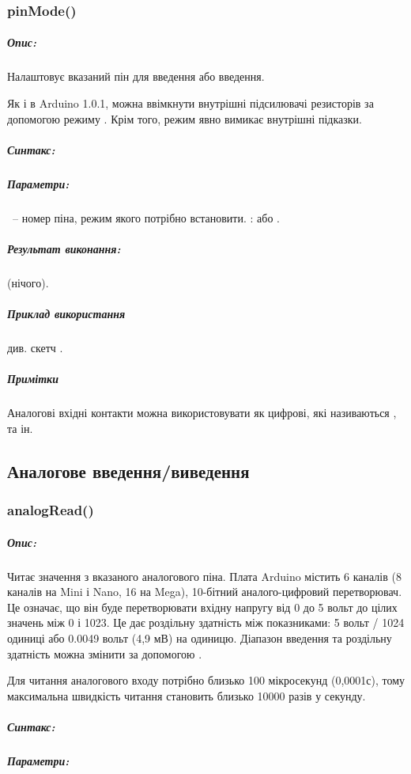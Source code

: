 \documentclass[12pt,a4paper]{report}  %
\begin{document}
\subsubsection{pinMode()}

\subparagraph{Опис:}

Налаштовує вказаний пін для введення або введення.

Як і в Arduino 1.0.1, можна ввімкнути внутрішні підсилювачі резисторів за допомогою режиму . Крім того, режим  явно вимикає внутрішні підказки.

\subparagraph{Синтакс:} 
\subparagraph{Параметри:}
~-- номер піна, режим якого потрібно встановити.
:  або .

\subparagraph{Результат виконання:}  (нічого).

\subparagraph{Приклад використання} див. скетч \hyperref[digitalwrite]{}.

\subparagraph{Примітки} Аналогові вхідні контакти можна використовувати як цифрові, які називаються ,  та ін.

\subsection{Аналогове введення/виведення}

\subsubsection{analogRead()}

\subparagraph{Опис:}

Читає значення з вказаного аналогового піна. Плата Arduino містить 6 каналів (8 каналів на Mini і Nano, 16 на Mega), 10-бітний аналого-цифровий перетворювач. Це означає, що він буде перетворювати вхідну напругу від 0 до 5 вольт до цілих значень між 0 і 1023. Це дає роздільну здатність між показниками: 5 вольт / 1024 одиниці або 0.0049 вольт (4,9 мВ) на одиницю. Діапазон введення та роздільну здатність можна змінити за допомогою \hyperref[analogReference]{}.

Для читання аналогового входу потрібно близько 100 мікросекунд (0,0001с), тому максимальна швидкість читання становить близько 10000 разів у секунду.

\subparagraph{Синтакс:} 
 
\subparagraph{Параметри:}
\end{document}
